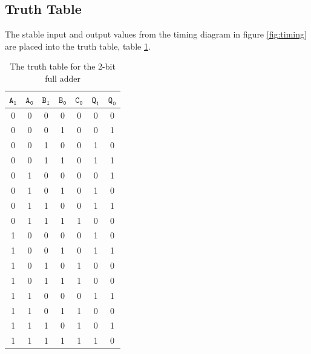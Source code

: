 \documentclass[12pt, titlepage]{article}
\newcommand\Aa{\ensuremath{\mathtt{A_0}}}
\newcommand\Ab{\ensuremath{\mathtt{A_1}}}
\newcommand\Ba{\ensuremath{\mathtt{B_0}}}
\newcommand\Bb{\ensuremath{\mathtt{B_1}}}
\newcommand\Qa{\ensuremath{\mathtt{Q_0}}}
\newcommand\Qb{\ensuremath{\mathtt{Q_1}}}
\newcommand\Ca{\ensuremath{\mathtt{C_0}}}
\begin{document}
    \subsection{Truth Table}
    The stable input and output values from the timing diagram in figure
    \ref{fig:timing} are placed into the truth table, table
    \ref{fig:truth}.
    \begin{table}[H]
        \centering
        \caption{The truth table for the 2-bit full adder}
        \label{fig:truth}
        \begin{tabular}{cc|cc||ccc}
            $\Ab$ & $\Aa$ & $\Bb$ & $\Ba$ & $\Ca$ & $\Qb$ & $\Qa$\\
            \hline
            0 & 0 & 0 & 0 & 0 & 0 & 0\\
            0 & 0 & 0 & 1 & 0 & 0 & 1\\
            0 & 0 & 1 & 0 & 0 & 1 & 0\\
            0 & 0 & 1 & 1 & 0 & 1 & 1\\
            0 & 1 & 0 & 0 & 0 & 0 & 1\\
            0 & 1 & 0 & 1 & 0 & 1 & 0\\
            0 & 1 & 1 & 0 & 0 & 1 & 1\\
            0 & 1 & 1 & 1 & 1 & 0 & 0\\
            1 & 0 & 0 & 0 & 0 & 1 & 0\\
            1 & 0 & 0 & 1 & 0 & 1 & 1\\
            1 & 0 & 1 & 0 & 1 & 0 & 0\\
            1 & 0 & 1 & 1 & 1 & 0 & 0\\
            1 & 1 & 0 & 0 & 0 & 1 & 1\\
            1 & 1 & 0 & 1 & 1 & 0 & 0\\
            1 & 1 & 1 & 0 & 1 & 0 & 1\\
            1 & 1 & 1 & 1 & 1 & 1 & 0\\
        \end{tabular}
    \end{table}
\end{document}
